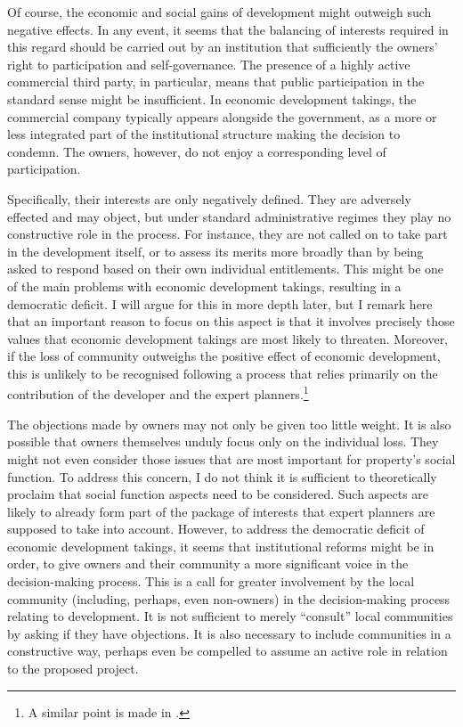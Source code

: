 {{Of course, the economic and social gains of development might outweigh such negative effects. In any event, it seems that the balancing of interests required in this regard should be carried out by an institution that sufficiently  the owners' right to participation and self-governance. The presence of a highly active commercial third party, in particular, means that public participation in the standard sense might be insufficient. In economic development takings, the commercial company typically appears alongside the government, as a more or less integrated part of the institutional structure making the decision to condemn. The owners, however, do not enjoy a corresponding level of participation.

Specifically, their interests are only negatively defined. They are adversely effected and may object, but under standard administrative regimes they play no constructive role in the process. For instance, they are not called on to take part in the development itself, or to assess its merits more broadly than by being asked to respond based on their own individual entitlements. This might be one of the main problems with economic development takings, resulting in a democratic deficit. I will argue for this in more depth later, but I remark here that an important reason to focus on this aspect is that it involves precisely those values that economic development takings are most likely to threaten. Moreover, if the loss of community outweighs the positive effect of economic development, this is unlikely to be recognised following a process that relies primarily on the contribution of the developer and the expert planners.\footnote{A similar point is made in \cite{underkuffler06}.} 

The objections made by owners may not only be given too little weight. It is also possible that owners themselves unduly focus only on the individual loss. They might not even consider those issues that are most important for property's social function. To address this concern, I do not think it is sufficient to theoretically proclaim that social function aspects need to be considered. Such aspects are likely to already form part of the package of interests that expert planners are supposed to take into account. However, to address the democratic deficit of economic development takings, it seems that institutional reforms might be in order, to give owners and their community a more significant voice in the decision-making process. This is a call for greater involvement by the local community (including, perhaps, even non-owners) in the decision-making process relating to development. It is not sufficient to merely ``consult'' local communities by asking if they have objections. It is also necessary to include communities in a constructive way, perhaps even be compelled to assume an active role in relation to the proposed project.

}}
